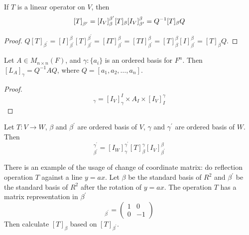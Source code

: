 \begin{theorem}\label{twoindextransform}
	If $T$ is a linear operator on $V$, then
	\begin{equation}
		\coordinate{T}_{\beta^\prime} = [I_V]_{\beta}^{\beta^\prime} [T]_\beta [I_V]_{\beta^\prime}^\beta= Q^{-1} [T]_\beta Q 
	\end{equation}
\end{theorem}

\begin{proof}
    $Q [T]_{\beta^\prime} = [I]_{\beta^\prime}^\beta [T]_{\beta^\prime}^{\beta^\prime} = [I T]_{\beta^\prime}^\beta = [T I]_{\beta^\prime}^\beta = [T]_\beta^\beta [I]_{\beta^\prime}^\beta = [T]_\beta Q$.
\end{proof}

\begin{theorem}
    Let $A \in M_{n \times n} (F)$, and $\gamma:\{a_i\}$ is an ordered basis for $F^n$. Then $[L_A]_\gamma = Q^{-1} A Q$, where $Q = [a_1, a_2, \dots, a_n]$.
\end{theorem}

\begin{proof}
    \begin{equation*}
        [L_A]_\gamma = [I_V]_\gamma^I \times A_I \times [I_V]_I^\gamma
    \end{equation*}
\end{proof}


\begin{theorem} \label{specialchangeofcoordinates}
	Let $T:V\rightarrow W$, $\beta$ and $\beta^\prime$ are ordered basis of $V$, $\gamma$ and $\gamma^\prime$ are ordered basis of $W$. Then
	\begin{equation}
		[T]_{\beta^\prime}^{\gamma^\prime} = [I_W]_\gamma^{\gamma^\prime} [T]_\beta^\gamma [I_V]_{\beta^\prime}^\beta
	\end{equation}
\end{theorem}


\begin{example}
There is an example of the usage of change of coordinate matrix: do reflection operation $T$ against a line $y = a x$. Let $\beta$ be the standard basis of $R^2$ and $\beta^\prime$ be the standard basis of $R^2$ after the rotation of $y = a x$. The operation $T$ has a matrix representation in $\beta^\prime$
	\begin{equation*}
		[T]_{\beta^\prime} = \begin{pmatrix}
			1 & 0 \\
			0 & -1
		\end{pmatrix}		
	\end{equation*}
	Then calculate $[T]_\beta$ based on $[T]_{\beta^\prime}$.    
\end{example}

